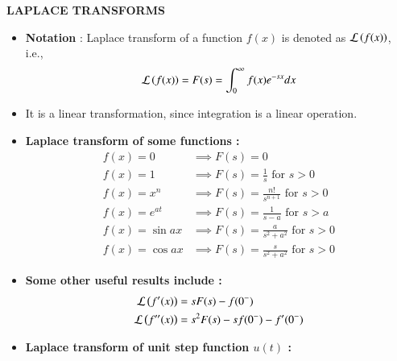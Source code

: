 \documentclass[journal]{IEEEtran}
\begin{document}
\textbf{LAPLACE TRANSFORMS} \\
\begin{itemize}
	\item \textbf{Notation} : Laplace transform of a function $f(x)$ is denoted as $\mathcal{L} \left(f(x)\right)$, i.e., 
		\begin{align}
			\mathcal{L} \left(f(x)\right) = F(s) = \int_{0}^{\infty} f(x) e^{-sx} dx \label{eq:lap} 
		\end{align}
	\item It is a linear transformation, since integration is a linear operation.
	\item \textbf{Laplace transform of some functions :} 
		\begin{align}
			f(x) = 0 &\implies F(s) = 0 \\
			f(x) = 1 &\implies F(s) = \frac{1}{s} \text{ for } s > 0\\
			f(x) = x^n &\implies F(s) = \frac{n!}{s^{n+1}} \text{ for } s > 0 \\
			f(x) = e^{at} &\implies F(s) = \frac{1}{s-a} \text{ for } s > a \\
			f(x) = \sin{ax} &\implies F(s) = \frac{a}{s^2 + a^2} \text{ for } s > 0 \\
			f(x) = \cos{ax} &\implies F(s) = \frac{s}{s^2 + a^2} \text{ for } s > 0
		\end{align}
	\item \textbf{Some other useful results include :}
		\begin{align}
			\mathcal{L} \left(f^{\prime}(x)\right) &= s F(s) - f(0^{-}) \\
			\mathcal{L} \left(f^{\prime \prime}(x)\right) &= s^2 F(s) - s f(0^{-}) - f^{\prime}(0^{-}) 
		\end{align}
	\item \textbf{Laplace transform of unit step function $u(t)$ :} \\

\end{itemize}
\end{document}
